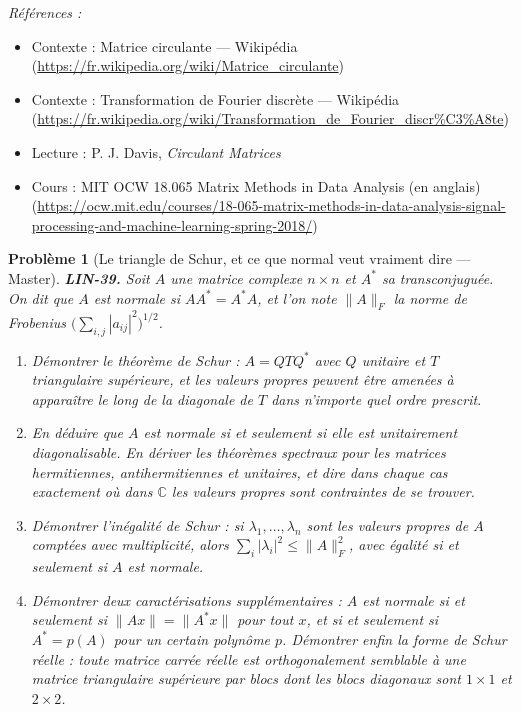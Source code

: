 \documentclass[11pt]{article}
\newtheorem{problem}{Problème}
\newenvironment{refs}{\par\small\noindent\emph{Références :}\begin{itemize}\setlength\itemsep{0pt}}{\end{itemize}\normalsize}
\begin{document}
\begin{refs}
\item Contexte : Matrice circulante --- Wikipédia (\url{https://fr.wikipedia.org/wiki/Matrice_circulante})
\item Contexte : Transformation de Fourier discrète --- Wikipédia (\url{https://fr.wikipedia.org/wiki/Transformation_de_Fourier_discr%C3%A8te})
\item Lecture : P. J. Davis, \textit{Circulant Matrices}
\item Cours : MIT OCW 18.065 Matrix Methods in Data Analysis (en anglais) (\url{https://ocw.mit.edu/courses/18-065-matrix-methods-in-data-analysis-signal-processing-and-machine-learning-spring-2018/})
\end{refs}

\bigskip

\begin{problem}[{Le triangle de Schur, et ce que \og{} normal \fg{} veut vraiment dire --- Master}]
\textbf{LIN-39.} Soit $A$ une matrice complexe $n \times n$ et $A^{*}$ sa transconjuguée. On
dit que $A$ est \textit{normale} si $A A^{*} = A^{*} A$, et l'on note $\|A\|_F$ la norme de
Frobenius $\big(\sum_{i,j} |a_{ij}|^2\big)^{1/2}$.
\begin{enumerate}
\item[(a)] Démontrer le théorème de Schur : $A = Q T Q^{*}$ avec $Q$ unitaire et $T$ triangulaire
supérieure, et les valeurs propres peuvent être amenées à apparaître le long de la diagonale de $T$
dans n'importe quel ordre prescrit.
\item[(b)] En déduire que $A$ est normale si et seulement si elle est unitairement diagonalisable. En
dériver les théorèmes spectraux pour les matrices hermitiennes, antihermitiennes et unitaires, et dire
dans chaque cas exactement où dans $\mathbb{C}$ les valeurs propres sont contraintes de se
trouver.
\item[(c)] Démontrer l'inégalité de Schur : si $\lambda_1, \dots, \lambda_n$ sont les valeurs propres de
$A$ comptées avec multiplicité, alors $\sum_i |\lambda_i|^2 \le \|A\|_F^2$, avec égalité si et
seulement si $A$ est normale.
\item[(d)] Démontrer deux caractérisations supplémentaires : $A$ est normale si et seulement si
$\|Ax\| = \|A^{*}x\|$ pour tout $x$, et si et seulement si $A^{*} = p(A)$ pour un certain
polynôme $p$. Démontrer enfin la forme de Schur réelle : toute matrice carrée réelle est
orthogonalement semblable à une matrice triangulaire supérieure par blocs dont les blocs diagonaux
sont $1 \times 1$ et $2 \times 2$.
\end{enumerate}

\end{problem}
\end{document}
